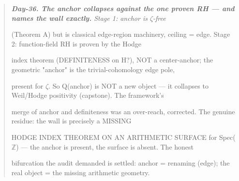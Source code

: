 \documentclass[10pt]{article}
\begin{document}
\begin{quote}\itshape
\textbf{Day-36. The anchor collapses against the one proven RH --- and names the wall exactly.} Stage 1: anchor is \ensuremath{\zeta}-free\par
(Theorem A) but is classical edge-region machinery, ceiling = edge. Stage 2: function-field RH is proven by the Hodge\par
index theorem (DEFINITENESS on H?), NOT a center-anchor; the geometric "anchor" is the trivial-cohomology edge pole,\par
present for \ensuremath{\zeta}. So Q(anchor) is NOT a new object --- it collapses to Weil/Hodge positivity (capstone). The framework's\par
merge of anchor and definiteness was an over-reach, corrected. The genuine residue: the wall is precisely a MISSING\par
HODGE INDEX THEOREM ON AN ARITHMETIC SURFACE for Spec(\ensuremath{\mathbb{Z}}) --- the anchor is present, the surface is absent. The honest\par
bifurcation the audit demanded is settled: anchor = renaming (edge); the real object = the missing arithmetic geometry.\par
\end{quote}
\end{document}
